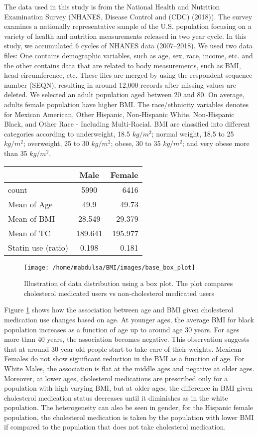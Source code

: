 \documentclass[
  12pt,
]{article}
\begin{document}
The data used in this study is from the National Health and Nutrition Examination Survey (NHANES, Disease Control and (CDC) (2018)). The survey examines a nationally representative sample of the U.S. population focusing on a variety of health and nutrition measurements released in two year cycle. In this study, we accumulated 6 cycles of NHANES data (2007--2018). We used two data files: One contains demographic variables, such as age, sex, race, income, etc. and the other contains data that are related to body measurements, such as BMI, head circumference, etc. These files are merged by using the respondent sequence number (SEQN), resulting in around 12,000 records after missing values are deleted. We selected an adult population aged between 20 and 80. On average, adults female population have higher BMI. The race/ethnicity variables denotes for Mexican American, Other Hispanic, Non-Hispanic White, Non-Hispanic Black, and Other Race - Including Multi-Racial.
BMI are classified into different categories according to underweight, 18.5 \(kg/m^2\); normal weight, 18.5 to 25 \(kg/m^2\); overweight, 25 to 30 \(kg/m^2\); obese, 30 to 35 \(kg/m^2\); and very obese more than 35 \(kg/m^2\).

\begin{longtable}[]{@{}lcr@{}}
\toprule
& Male & Female\tabularnewline
\midrule
\endhead
count & 5990 & 6416\tabularnewline
Mean of Age & 49.9 & 49.73\tabularnewline
Mean of BMI & 28.549 & 29.379\tabularnewline
Mean of TC & 189.641 & 195.977\tabularnewline
Statin use (ratio) & 0.198 & 0.181\tabularnewline
\bottomrule
\end{longtable}

\begin{figure}

{\centering \texttt{[image: /home/mabdulsa/BMI/images/base\_box\_plot]} 

}

\caption{Illustration of data distribution using a box plot. The plot compares cholesterol medicated users vs non-cholesterol medicated users}\label{fig:box}
\end{figure}

Figure \ref{fig:box} shows how the association between age and BMI given cholesterol medication use changes based on age. At younger ages, the average BMI for black population increases as a function of age up to around age 30 years. For ages more than 40 years, the association becomes negative. This observation suggests that at around 30 year old people start to take care of their weights. Mexican Females do not show significant reduction in the BMI as a function of age. For White Males, the association is flat at the middle ages and negative at older ages. Moreover, at lower ages, cholesterol medications are prescribed only for a population with high varying BMI, but at older ages, the difference in BMI given cholesterol medication status decreases until it diminishes as in the white population. The heterogeneity can also be seen in gender, for the Hispanic female population, the cholesterol medication is taken by the population with lower BMI if compared to the population that does not take cholesterol medication.
\end{document}
